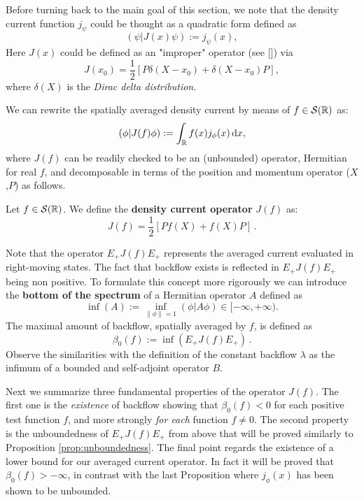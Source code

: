 \begin{oss}
	Before turning back to the main goal of this section, we note that the density current function $j_\psi$ could be thought as a quadratic form defined as
	\begin{equation}
	(\psi|J(x)\psi):=j_\psi(x),
	\end{equation}
	Here $J(x)$ could be defined as an "improper" operator (see [\citealp{years2}]) via
	\begin{equation}
	J(x_0)=\frac{1}{2}[P\delta(X-x_0)+\delta(X-x_0)P],
	\end{equation}
	where $\delta(X)$ is the \textit{Dirac delta distribution}.
\end{oss}
We can rewrite the spatially averaged density current by means of $f\in\mathcal{S}({\mathbb R})$ as:
\begin{equation}
(\phi|J(f)\phi):=\int_{{\mathbb R}} f(x)j_\phi(x)\, \mathrm d x,
\end{equation}
where $J(f)$ can be readily checked to be an (unbounded) operator, Hermitian for real $f$, and decomposable in terms of the position and momentum operator ($X$,$P$) as follows.
\begin{definition}
	Let $f\in\mathcal{S}({\mathbb R})$. We define the \textbf{density current operator} $J(f)$ as:
	\begin{equation}
	J(f)=\frac{1}{2}[Pf(X)+f(X)P]\,.
	\label{eq:density_operator}
	\end{equation}
\end{definition}
\begin{rem}
	Note that the operator $E_+J(f)E_+$ represents the averaged current evaluated in right-moving states. The fact that backflow exists is reflected in  $E_+J(f)E_+$ being non positive. To formulate this concept more rigorously we can introduce the \textbf{bottom of the spectrum} of a Hermitian operator $A$ defined as
	\begin{equation}
	\inf(A):=\inf_{\|\phi\|=1}(\phi|A\phi)\in[-\infty,+\infty).
	\end{equation}
	The maximal amount of backflow, spatially averaged by $f$, is defined as
	\begin{equation}
	\beta_0(f):=\inf(E_+J(f)E_+)\, .
	\end{equation}
	Observe the similarities with the definition of the constant backflow $\lambda$ as the infimum of a bounded and self-adjoint operator $B$.
\end{rem}
 Next we summarize three fundamental properties of the operator $J(f)$. The first one is the \textit{existence} of backflow showing that $\beta_0(f)<0$ for each positive test function $f$, and more strongly \textit{for each} function $f\neq0$. The second property is the unboundedness of $E_+J(f)E_+$ from above that will be proved similarly to Proposition \ref{prop:unboundedness}. The final point regards the existence of a lower bound for our averaged current operator. In fact it will be proved that $\beta_0(f)>-\infty$, in contrast with the last Proposition where $j_\phi(x)$ has been shown to be unbounded.
 
